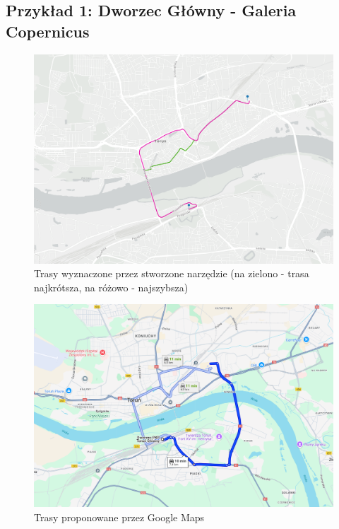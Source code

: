 \documentclass{article}
\begin{document}
\subsection{Przykład 1: Dworzec Główny - Galeria Copernicus}
\begin{figure}[H]
    \centering
    \includegraphics[width=1\textwidth]{img/glowny-copernicus.png}
    \caption{Trasy wyznaczone przez stworzone narzędzie (na zielono - trasa najkrótsza, na różowo - najszybsza)}
\end{figure}

\begin{figure}[H]
    \centering
    \includegraphics[width=1\textwidth]{img/glowny-copernicus-google.png}
    \caption{Trasy proponowane przez Google Maps}
\end{figure}
\end{document}
